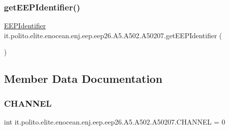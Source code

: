 \subsubsection{\texorpdfstring{get\+E\+E\+P\+Identifier()}{getEEPIdentifier()}}
{\footnotesize\ttfamily \hyperlink{classit_1_1polito_1_1elite_1_1enocean_1_1enj_1_1eep_1_1_e_e_p_identifier}{E\+E\+P\+Identifier} it.\+polito.\+elite.\+enocean.\+enj.\+eep.\+eep26.\+A5.\+A502.\+A50207.\+get\+E\+E\+P\+Identifier (\begin{DoxyParamCaption}{ }\end{DoxyParamCaption})}



\subsection{Member Data Documentation}
\hypertarget{classit_1_1polito_1_1elite_1_1enocean_1_1enj_1_1eep_1_1eep26_1_1_a5_1_1_a502_1_1_a50207_a04f430ff68a7ec34daf67ad6452d26f4}{}\label{classit_1_1polito_1_1elite_1_1enocean_1_1enj_1_1eep_1_1eep26_1_1_a5_1_1_a502_1_1_a50207_a04f430ff68a7ec34daf67ad6452d26f4} 
\subsubsection{\texorpdfstring{C\+H\+A\+N\+N\+EL}{CHANNEL}}
{\footnotesize\ttfamily int it.\+polito.\+elite.\+enocean.\+enj.\+eep.\+eep26.\+A5.\+A502.\+A50207.\+C\+H\+A\+N\+N\+EL = 0\hspace{0.3cm}{\ttfamily [static]}}

\hypertarget{classit_1_1polito_1_1elite_1_1enocean_1_1enj_1_1eep_1_1eep26_1_1_a5_1_1_a502_1_1_a50207_a2b1bb51cfcf21774079c6ea4190d9f02}{}\label{classit_1_1polito_1_1elite_1_1enocean_1_1enj_1_1eep_1_1eep26_1_1_a5_1_1_a502_1_1_a50207_a2b1bb51cfcf21774079c6ea4190d9f02} 
